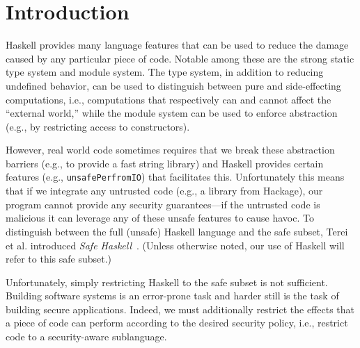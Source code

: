 \section{Introduction}
\label{sec:intro}

Haskell provides many language features that can be used to reduce the
damage caused by any particular piece of code.
%
Notable among these are the strong static type system and module
system.
%
The type system, in addition to reducing undefined behavior, can be
used to distinguish between pure and side-effecting computations,
i.e., computations that respectively can and cannot affect the
``external world,'' while the module system can be used to enforce
abstraction (e.g., by restricting access to constructors).
%

However, real world code sometimes requires that we break these
abstraction barriers (e.g., to provide a fast string library) and
Haskell provides certain features (e.g., \verb|unsafePerfromIO|) that
facilitates this.
%
Unfortunately this means that if we integrate any untrusted code
(e.g., a library from Hackage), our program cannot provide any
security guarantees---if the untrusted code is malicious it can
leverage any of these unsafe features to cause havoc.
%
To distinguish between the full (unsafe) Haskell language and the safe
subset, Terei et al. introduced \emph{Safe
Haskell}~\cite{safehaskell}.
%
(Unless otherwise noted, our use of Haskell will refer to this safe
subset.)

Unfortunately, simply restricting Haskell to the safe subset is not
sufficient.
%
Building software systems is an error-prone task and harder still is
the task of building secure applications.
%
Indeed, we must additionally restrict the effects that a piece of code
can perform according to the desired security policy, i.e., restrict
code to a security-aware sublanguage.
%



